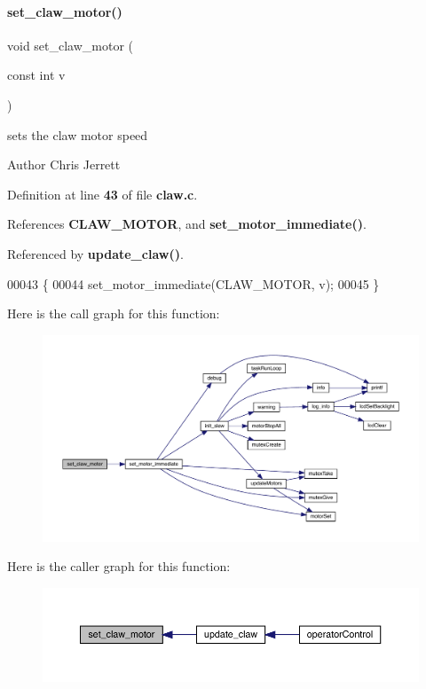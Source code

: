 \paragraph{set\+\_\+claw\+\_\+motor()}
{\footnotesize\ttfamily void set\+\_\+claw\+\_\+motor (\begin{DoxyParamCaption}\item[{const int}]{v }\end{DoxyParamCaption})}



sets the claw motor speed 

\begin{DoxyAuthor}{Author}
Chris Jerrett 
\end{DoxyAuthor}


Definition at line \textbf{ 43} of file \textbf{ claw.\+c}.



References \textbf{ C\+L\+A\+W\+\_\+\+M\+O\+T\+OR}, and \textbf{ set\+\_\+motor\+\_\+immediate()}.



Referenced by \textbf{ update\+\_\+claw()}.


\begin{DoxyCode}
00043                                 \{
00044   set_motor_immediate(CLAW_MOTOR, v);
00045 \}
\end{DoxyCode}
Here is the call graph for this function\+:\nopagebreak
\begin{figure}[H]
\begin{center}
\leavevmode
\includegraphics[width=350pt]{claw_8c_a3a57f998b1884d39b0cc786689f7086f_cgraph}
\end{center}
\end{figure}
Here is the caller graph for this function\+:\nopagebreak
\begin{figure}[H]
\begin{center}
\leavevmode
\includegraphics[width=350pt]{claw_8c_a3a57f998b1884d39b0cc786689f7086f_icgraph}
\end{center}
\end{figure}
\mbox{\label{claw_8c_a0122b78972344264b8a276a559cfce4a}} 
